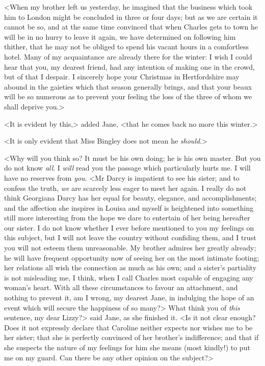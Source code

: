 <When my brother left us yesterday, he imagined that the business which took him to London might be concluded in three or four days; but as we are certain it cannot be so, and at the same time convinced that when Charles gets to town he will be in no hurry to leave it again, we have determined on following him thither, that he may not be obliged to spend his vacant hours in a comfortless hotel. Many of my acquaintance are already there for the winter: I wish I could hear that you, my dearest friend, had any intention of making one in the crowd, but of that I despair. I sincerely hope your Christmas in Hertfordshire may abound in the gaieties which that season generally brings, and that your beaux will be so numerous as to prevent your feeling the loss of the three of whom we shall deprive you.>

<It is evident by this,> added Jane, <that he comes back no more this winter.>

<It is only evident that Miss Bingley does not mean he \textit{should}.>

<Why will you think so? It must be his own doing; he is his own master. But you do not know \textit{all}. I \textit{will} read you the passage which particularly hurts me. I will have no reserves from \textit{you}. <Mr Darcy is impatient to see his sister; and to confess the truth, \textit{we} are scarcely less eager to meet her again. I really do not think Georgiana Darcy has her equal for beauty, elegance, and accomplishments; and the affection she inspires in Louisa and myself is heightened into something still more interesting from the hope we dare to entertain of her being hereafter our sister. I do not know whether I ever before mentioned to you my feelings on this subject, but I will not leave the country without confiding them, and I trust you will not esteem them unreasonable. My brother admires her greatly already; he will have frequent opportunity now of seeing her on the most intimate footing; her relations all wish the connection as much as his own; and a sister's partiality is not misleading me, I think, when I call Charles most capable of engaging any woman's heart. With all these circumstances to favour an attachment, and nothing to prevent it, am I wrong, my dearest Jane, in indulging the hope of an event which will secure the happiness of so many?> What think you of \textit{this} sentence, my dear Lizzy?> said Jane, as she finished it. <Is it not clear enough? Does it not expressly declare that Caroline neither expects nor wishes me to be her sister; that she is perfectly convinced of her brother's indifference; and that if she suspects the nature of my feelings for him she means (most kindly!) to put me on my guard. Can there be any other opinion on the subject?>

